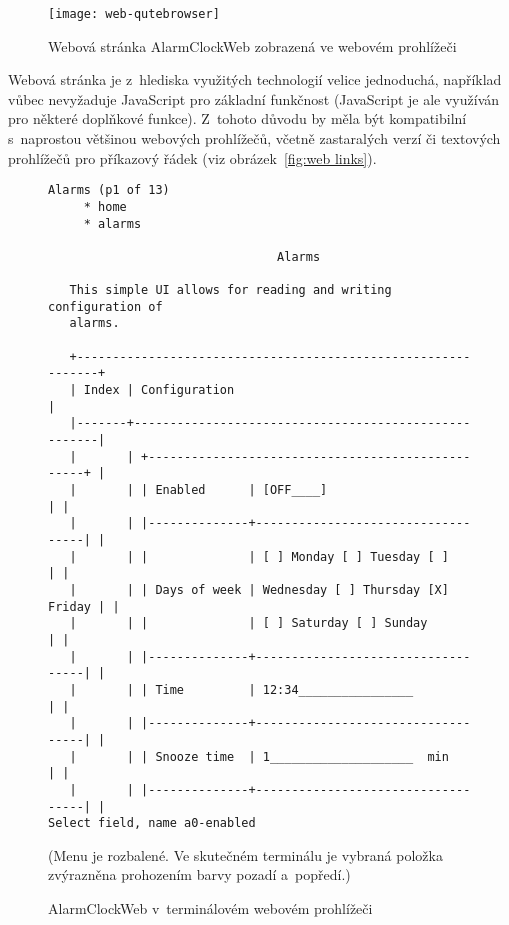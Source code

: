 \begin{figure}[htbp]
    \centering
    \texttt{[image: web-qutebrowser]}
    \caption{%
        Webová stránka AlarmClockWeb zobrazená ve webovém prohlížeči
    }
    \label{fig:web qutebrowser}
\end{figure}

Webová stránka je z~hlediska využitých technologií velice jednoduchá, například
vůbec nevyžaduje JavaScript pro základní funkčnost (JavaScript je ale využíván
pro některé doplňkové funkce). Z~tohoto důvodu by měla být kompatibilní
s~naprostou většinou webových prohlížečů, včetně zastaralých verzí či textových
prohlížečů pro příkazový řádek (viz obrázek~\vref{fig:web links}).

\begin{figure}[htbp]
    \begin{lstlisting}[style=terminal,columns=fixed]
                                                    Alarms (p1 of 13) 
     * home                                                           
     * alarms                                                         
                                                                      
                                Alarms                                
                                                                      
   This simple UI allows for reading and writing configuration of     
   alarms.                                                            
                                                                      
   +--------------------------------------------------------------+   
   | Index | Configuration                                        |   
   |-------+------------------------------------------------------|   
   |       | +--------------------------------------------------+ |   
   |       | | Enabled      | [OFF____]                         | |   
   |       | |--------------+-----------------------------------| |   
   |       | |              | [ ] Monday [ ] Tuesday [ ]        | |   
   |       | | Days of week | Wednesday [ ] Thursday [X] Friday | |   
   |       | |              | [ ] Saturday [ ] Sunday           | |   
   |       | |--------------+-----------------------------------| |   
   |       | | Time         | 12:34________________             | |   
   |       | |--------------+-----------------------------------| |   
   |       | | Snooze time  | 1____________________  min        | |   
   |       | |--------------+-----------------------------------| |   
Select field, name a0-enabled                                        
    \end{lstlisting}
    {\footnotesize (Menu  je rozbalené. Ve skutečném terminálu je
    vybraná položka zvýrazněna prohozením barvy pozadí a~popředí.)}
    \caption{AlarmClockWeb v~terminálovém webovém prohlížeči }
    \label{fig:web links}
\end{figure}

